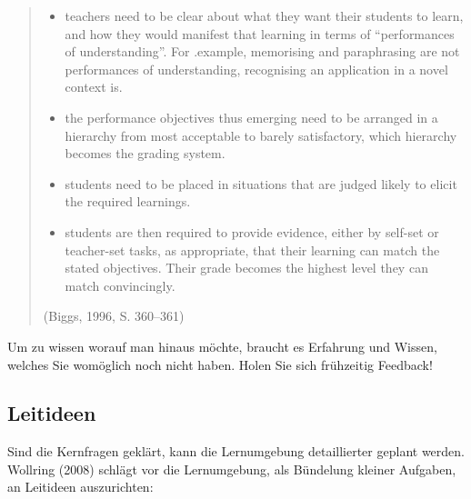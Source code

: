 \documentclass[
  10pt,
  a4paper,
  DIV=11]{scrartcl}
\providecommand{\tightlist}{%
  \setlength{\itemsep}{0pt}\setlength{\parskip}{0pt}}\usepackage{longtable,booktabs,array}
\begin{document}
\begin{quote}
\begin{itemize}
\tightlist
\item
  teachers need to be clear about what they want their students to
  learn, and how they would manifest that learning in terms of
  ``performances of understanding''. For .example, memorising and
  paraphrasing are not performances of understanding, recognising an
  application in a novel context is.
\item
  the performance objectives thus emerging need to be arranged in a
  hierarchy from most acceptable to barely satisfactory, which hierarchy
  becomes the grading system.
\item
  students need to be placed in situations that are judged likely to
  elicit the required learnings.
\item
  students are then required to provide evidence, either by self-set or
  teacher-set tasks, as appropriate, that their learning can match the
  stated objectives. Their grade becomes the highest level they can
  match convincingly.
\end{itemize}

(Biggs, 1996, S. 360--361)
\end{quote}

\begin{tcolorbox}[enhanced jigsaw, title=\textcolor{quarto-callout-tip-color}{\faLightbulb}\hspace{0.5em}{Tipp}, colbacktitle=quarto-callout-tip-color!10!white, breakable, leftrule=.75mm, arc=.35mm, toptitle=1mm, opacityback=0, coltitle=black, left=2mm, opacitybacktitle=0.6, colback=white, bottomtitle=1mm, colframe=quarto-callout-tip-color-frame, titlerule=0mm, rightrule=.15mm, bottomrule=.15mm, toprule=.15mm]

Um zu wissen worauf man hinaus möchte, braucht es Erfahrung und Wissen,
welches Sie womöglich noch nicht haben. Holen Sie sich frühzeitig
Feedback!

\end{tcolorbox}

\subsection{Leitideen}\label{leitideen}

Sind die Kernfragen geklärt, kann die Lernumgebung detaillierter geplant
werden. Wollring (2008) schlägt vor die Lernumgebung, als Bündelung
kleiner Aufgaben, an Leitideen auszurichten:
\end{document}

